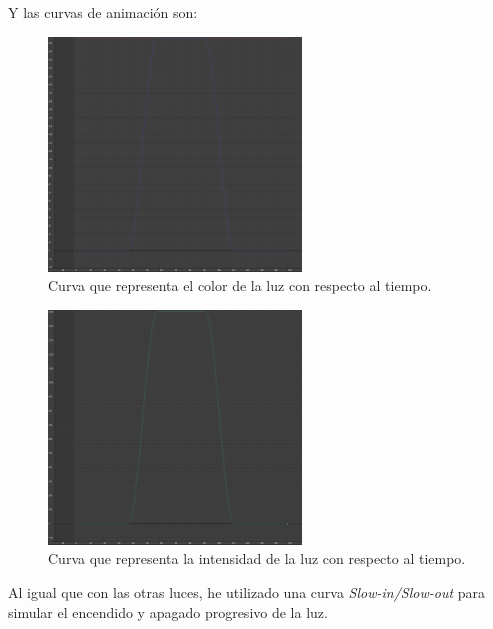 \newpage

Y las curvas de animación son:

\begin{figure}[H]
    \centering
    \includegraphics[width=0.6\textwidth]{imagenes/curvas/LC/filter.png}
    \caption{Curva que representa el color de la luz con respecto al tiempo.}
 \end{figure}

 \begin{figure}[H]
    \centering
    \includegraphics[width=0.6\textwidth]{imagenes/curvas/LC/intensity.png}
    \caption{Curva que representa la intensidad de la luz con respecto al tiempo.}
 \end{figure}

Al igual que con las otras luces, he utilizado una curva \textit{Slow-in/Slow-out} para simular el encendido y apagado progresivo de la luz.